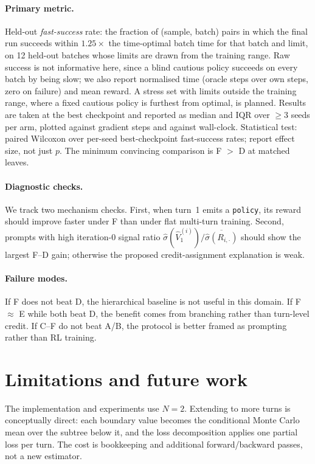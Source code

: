 \documentclass[11pt,a4paper]{article}
\begin{document}
\paragraph{Primary metric.} Held-out \emph{fast-success} rate: the
fraction of (sample, batch) pairs in which the final run succeeds within
$1.25\times$ the time-optimal batch time for that batch and limit, on 12
held-out batches whose limits are drawn from the training range. Raw
success is not informative here, since a blind cautious policy succeeds on
every batch by being slow; we also report normalised time (oracle steps
over own steps, zero on failure) and mean reward. A stress set with limits
outside the training range, where a fixed cautious policy is furthest from
optimal, is planned. Results are taken at the best checkpoint and reported
as median and IQR over $\geq 3$ seeds per arm, plotted against gradient
steps and against wall-clock. Statistical test: paired Wilcoxon over
per-seed best-checkpoint fast-success rates; report effect size, not just
$p$. The minimum convincing comparison is F $>$ D at matched leaves.

\paragraph{Diagnostic checks.}
We track two mechanism checks. First, when turn~1 emits a \texttt{policy}, its reward should improve faster under F than under flat multi-turn training. Second, prompts with high iteration-0 signal ratio $\widehat\sigma(\widehat V_1^{(i)})/\overline{\widehat\sigma(R_{i,\cdot})}$ should show the largest F--D gain; otherwise the proposed credit-assignment explanation is weak.

\paragraph{Failure modes.} If F does not beat D, the hierarchical baseline is not useful in this domain. If F $\approx$ E while both beat D, the benefit comes from branching rather than turn-level credit. If C--F do not beat A/B, the protocol is better framed as prompting rather than RL training.

\section{Limitations and future work}
\label{sec:limitations}

The implementation and experiments use $N=2$. Extending to more turns is conceptually direct: each boundary value becomes the conditional Monte Carlo mean over the subtree below it, and the loss decomposition applies one partial loss per turn. The cost is bookkeeping and additional forward/backward passes, not a new estimator.
\end{document}
